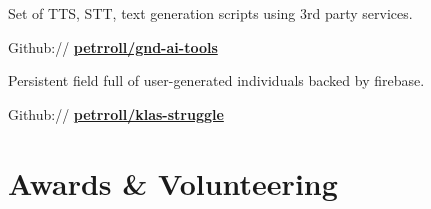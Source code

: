 \documentclass[a4paper]{deedy-resume} %
\begin{document}
\begin{minipage}[t]{0.62\textwidth}
\halfsectionspace %


\emptyLocation %
\begin{tightitemize}
\item Set of TTS, STT, text generation scripts using 3rd party services.
\item Github:// \href{https://github.com/petrroll/gnd-ai-tools}{\bf petrroll/gnd-ai-tools}
\end{tightitemize}

\halfsectionspace %



\emptyLocation %
\begin{tightitemize}
\item Persistent field full of user-generated individuals backed by firebase.
\item Github:// \href{https://github.com/petrroll/klas-struggle}{\bf petrroll/klas-struggle}
\end{tightitemize}

\sectionspace %





\section{Awards \& Volunteering} 


\end{minipage}
\end{document}
